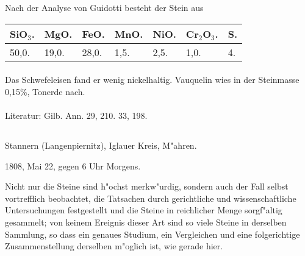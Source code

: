 \documentclass[a4paper, 11pt, oneside]{article}
\begin{document}
Nach der Analyse von Guidotti besteht der Stein aus
\begin{table}[!ht]
    \centering\swabfamily\Large
    \begin{tabular}{l l l l l l l}
        SiO$_{3}$. & MgO. & FeO. & MnO. & NiO. & Cr$_{2}$O$_{3}$. & S. \\ \hline
        50,0. & 19,0. & 28,0. & 1,5. & 2,5. & 1,0. & 4. \\
    \end{tabular}
\end{table}
\paragraph{}
Das Schwefeleisen fand er wenig nickelhaltig. Vauquelin wies in der Steinmasse 0,15\%, Tonerde nach.
\normalsize
\paragraph{}
Literatur: Gilb. Ann. 29, 210. 33, 198.
\subsection{}
\LARGE
\paragraph{}
Stannern (Langenpiernitz), Iglauer Kreis, M"ahren.

1808, Mai 22, gegen 6 Uhr Morgens.

Nicht nur die Steine sind h"ochst merkw"urdig, sondern auch der Fall selbst vortrefflich beobachtet, die Tatsachen durch gerichtliche und wissenschaftliche Untersuchungen festgestellt und die Steine in reichlicher Menge sorgf"altig gesammelt; von keinem Ereignis dieser Art sind so viele Steine in derselben Sammlung, so dass ein genaues Studium, ein Vergleichen und eine folgerichtige Zusammenstellung derselben m"oglich ist, wie gerade hier.
\end{document}
